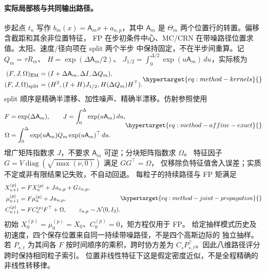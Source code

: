 \paragraph{实际局部核与共同输出路径。}
步起点 \(t_n\) 写作 \(b_m(x)=\mathsf A_m x+a_{n,p}\)，其中
\(\mathsf A_m\) 是 \(\Theta_m\) 两个位置行的转置。偏移含截距和其余非位置特征，
FP 在步初条件中心、MC/CRN 在带噪路径位置求值。太阳、速度/径向项在 split 两个半步
中保持固定，不在半步间重算。记 \(Q_m=\tau R_m\)、
\(H=\exp(\Delta\mathsf A_m/2)\)、
\(J_{1/2}=\int_0^{\Delta/2}\exp(u\mathsf A_m)\,du\)，实际核为
\begin{equation}
\begin{aligned}
(F,J,\Omega)_{\rm EM}&=(I+\Delta\mathsf A_m,\Delta I,\Delta Q_m),\\
(F,J,\Omega)_{\rm split}&=(H^2,(I+H)J_{1/2},H(\Delta Q_m)H^\top).
\end{aligned}
\label{eq:method-kernels}\hypertarget{eq:method-kernels}{}
\end{equation}
split 顺序是精确半漂移、加性噪声、精确半漂移。仿射参照使用
\begin{equation}
\begin{aligned}
F&=\exp(\Delta\mathsf A_m),\qquad
J=\int_0^\Delta\exp(u\mathsf A_m)\,du,\\
\Omega&=\int_0^\Delta\exp(u\mathsf A_m)Q_m\exp(u\mathsf A_m)^\top\,du.
\end{aligned}
\label{eq:method-affine-exact}\hypertarget{eq:method-affine-exact}{}
\end{equation}
增广矩阵指数求 \(J\)，不要求 \(\mathsf A_m\) 可逆；分块矩阵指数求 \(\Omega\)。
特征因子 \(G=V\operatorname{diag}(\sqrt{\max(\nu,0)})\) 满足 \(GG^\top=\Omega\)，
仅移除负特征值舍入误差；实质不定或非有限结果记失败，不自动回退。
每粒子的持续路径与 FP 矩满足
\begin{equation}
\begin{aligned}
X_{n+1}^{(p)}&=F X_n^{(p)}+J a_{n,p}+Gz_{n,p},\\
\mu_{n+1}^{(p)}&=F\mu_n^{(p)}+J a_{n,p},\\
C_{n+1}^{(p)}&=F C_n^{(p)}F^\top+\Omega,
\qquad z_{n,p}\sim\mathcal N(0,I_2).
\end{aligned}
\label{eq:method-joint-propagation}\hypertarget{eq:method-joint-propagation}{}
\end{equation}
初始 \(X_0^{(p)}=\mu_0^{(p)}=X_0\)、\(C_0^{(p)}=0\)，矩方程仅用于 FP。
给定抽样模式历史及初速度，四个保存位置来自同一持续带噪路径，不是四个高斯边际的
独立抽样。若 \(P_{s,t}\) 为其间各 \(F\) 按时间顺序的乘积，跨时协方差为
\(C_sP_{s,t}^{\top}\)。因此八维路径评分跨时保持相同粒子索引。
位置非线性特征下这是假定密度近似，不是全程精确的非线性转移律。

